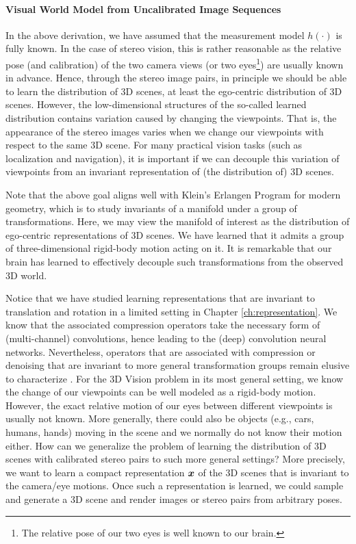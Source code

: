 \documentclass[../../book-main.tex]{subfiles}
\begin{document}
\paragraph{Visual World Model from Uncalibrated Image Sequences}

In the above derivation, we have assumed that the measurement model $h(\cdot)$ is fully known. In the case of stereo vision, this is rather reasonable as the relative pose (and calibration) of the two camera views (or two eyes\footnote{The relative pose of our two eyes is well known to our brain.}) are usually known in advance. Hence, through the stereo image pairs, in principle we should be able to learn the distribution of 3D scenes, at least the ego-centric distribution of 3D scenes. However, the low-dimensional structures of the so-called learned distribution contains variation caused by changing the viewpoints. That is, the appearance of the stereo images varies when we change our viewpoints with respect to the same 3D scene. For many practical vision tasks (such as localization and navigation), it is important if we can decouple this variation of viewpoints from an invariant representation of (the distribution of) 3D scenes.

\begin{remark}Note that the above goal aligns well with Klein's Erlangen Program for modern geometry, which is to study invariants of a manifold under a group of transformations. Here, we may view the manifold of interest as the distribution of ego-centric representations of 3D scenes. We have learned that it admits a group of three-dimensional rigid-body motion acting on it. It is remarkable that our brain has learned to effectively decouple such transformations from the observed 3D world.
\end{remark}


Notice that we have studied learning representations that are invariant to translation and rotation in a limited setting in Chapter \ref{ch:representation}. We know that the associated compression operators take the necessary form of (multi-channel) convolutions, hence leading to the (deep) convolution neural networks. Nevertheless, operators that are associated with compression or denoising that are invariant to more general transformation groups remain elusive to characterize \cite{cohen2016group}.  
For the 3D Vision problem in its most general setting, we know the change of our viewpoints can be well modeled as a rigid-body motion. However, the exact relative motion of our eyes between different viewpoints is usually not known. More generally, there could also be objects (e.g., cars, humans, hands) moving in the scene and we normally do not know their motion either. How can we generalize the problem of learning the distribution of 3D scenes with calibrated stereo pairs to such more general settings? More precisely, we want to learn a compact representation $\bm{x}$ of the 3D scenes that is invariant to the camera/eye motions. Once such a representation is learned, we could sample and generate a 3D scene and render images or stereo pairs from arbitrary poses. 
\end{document}
